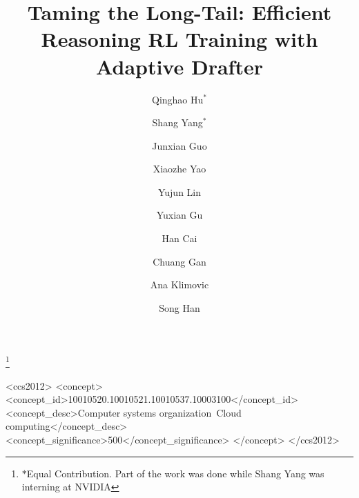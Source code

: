 \documentclass[sigplan,screen]{acmart}
\begin{document}
\title{Taming the Long-Tail: Efficient Reasoning RL Training with Adaptive Drafter}


\author{Qinghao Hu$^*$}
\author{Shang Yang$^*$}

\author{Junxian Guo}

\author{Xiaozhe Yao}

\author{Yujun Lin}

\author{Yuxian Gu}

\author{Han Cai}


\author{Chuang Gan}


\author{Ana Klimovic}

\author{Song Han}

\thanks{$*$\hspace{1mm}Equal Contribution. Part of the work was done while Shang Yang was interning at NVIDIA \vspace{-6pt}}

\renewcommand{\shortauthors}{Qinghao Hu et al.}

\begin{CCSXML}
<ccs2012>
   <concept>
       <concept_id>10010520.10010521.10010537.10003100</concept_id>
       <concept_desc>Computer systems organization~Cloud computing</concept_desc>
       <concept_significance>500</concept_significance>
       </concept>
 </ccs2012>
\end{CCSXML}
\end{document}
